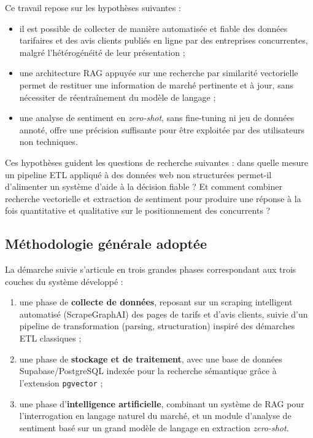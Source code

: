 Ce travail repose sur les hypothèses suivantes :
\begin{itemize}
    \item il est possible de collecter de manière automatisée et fiable des données tarifaires et des avis
    clients publiés en ligne par des entreprises concurrentes, malgré l'hétérogénéité de leur présentation ;
    \item une architecture RAG appuyée sur une recherche par similarité vectorielle permet de restituer une
    information de marché pertinente et à jour, sans nécessiter de réentraînement du modèle de langage ;
    \item une analyse de sentiment en \textit{zero-shot}, sans fine-tuning ni jeu de données annoté, offre une
    précision suffisante pour être exploitée par des utilisateurs non techniques.
\end{itemize}

Ces hypothèses guident les questions de recherche suivantes : dans quelle mesure un pipeline ETL appliqué à
des données web non structurées permet-il d'alimenter un système d'aide à la décision fiable ? Et comment
combiner recherche vectorielle et extraction de sentiment pour produire une réponse à la fois quantitative
et qualitative sur le positionnement des concurrents ?

\subsection{Méthodologie générale adoptée}

La démarche suivie s'articule en trois grandes phases correspondant aux trois couches du système développé :

\begin{enumerate}
    \item une phase de \textbf{collecte de données}, reposant sur un scraping intelligent automatisé
    (ScrapeGraphAI) des pages de tarifs et d'avis clients, suivie d'un pipeline de transformation
    (parsing, structuration) inspiré des démarches ETL classiques ;
    \item une phase de \textbf{stockage et de traitement}, avec une base de données Supabase/PostgreSQL
    indexée pour la recherche sémantique grâce à l'extension \texttt{pgvector} ;
    \item une phase d'\textbf{intelligence artificielle}, combinant un système de RAG pour l'interrogation en
    langage naturel du marché, et un module d'analyse de sentiment basé sur un grand modèle de langage en
    extraction \textit{zero-shot}.
\end{enumerate}

